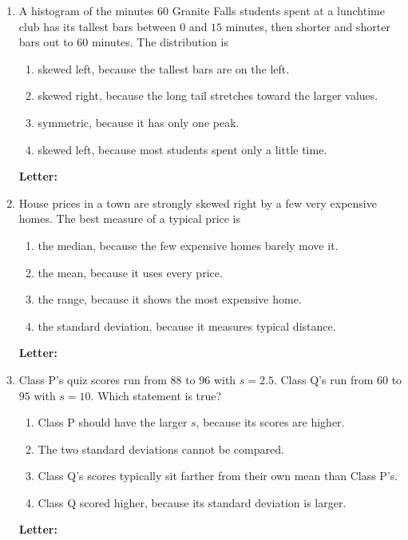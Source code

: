 \documentclass[10pt]{article}
\begin{document}
\small
\begin{enumerate}[leftmargin=2.2em, itemsep=5pt, topsep=2pt, start=11]

\boxguard[9]
\item A histogram of the minutes $60$ Granite Falls students spent at a lunchtime club has
its tallest bars between $0$ and $15$ minutes, then shorter and shorter bars out to $60$
minutes. The distribution is
\begin{enumerate}[label=(\Alph*), leftmargin=1.8em, itemsep=1pt, topsep=1pt]
  \item skewed left, because the tallest bars are on the left.
  \item skewed right, because the long tail stretches toward the larger values.
  \item symmetric, because it has only one peak.
  \item skewed left, because most students spent only a little time.
\end{enumerate}
\hfill \textbf{Letter:} \gradedblank[id=q11, type=choice, points=2, answer={B}]{0.9cm}{11pt}

\boxguard[9]
\item House prices in a town are strongly skewed right by a few very expensive homes. The
best measure of a typical price is
\begin{enumerate}[label=(\Alph*), leftmargin=1.8em, itemsep=1pt, topsep=1pt]
  \item the median, because the few expensive homes barely move it.
  \item the mean, because it uses every price.
  \item the range, because it shows the most expensive home.
  \item the standard deviation, because it measures typical distance.
\end{enumerate}
\hfill \textbf{Letter:} \gradedblank[id=q12, type=choice, points=2, answer={A}]{0.9cm}{11pt}

\boxguard[9]
\item Class P's quiz scores run from $88$ to $96$ with $s = 2.5$. Class Q's run from $60$ to
$95$ with $s = 10$. Which statement is true?
\begin{enumerate}[label=(\Alph*), leftmargin=1.8em, itemsep=1pt, topsep=1pt]
  \item Class P should have the larger $s$, because its scores are higher.
  \item The two standard deviations cannot be compared.
  \item Class Q's scores typically sit farther from their own mean than Class P's.
  \item Class Q scored higher, because its standard deviation is larger.
\end{enumerate}
\hfill \textbf{Letter:} \gradedblank[id=q13, type=choice, points=2, answer={C}]{0.9cm}{11pt}


\end{enumerate}
\end{document}
